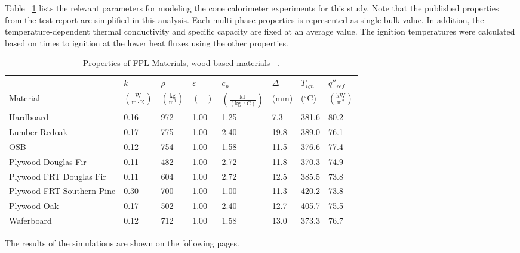 Table ~\ref{Properties_FPL_Wood_Materials_woods} lists the relevant parameters for modeling the cone calorimeter experiments for this study.
Note that the published properties from the test report are simplified in this analysis. Each multi-phase properties is represented as single bulk value.
In addition, the temperature-dependent thermal conductivity and specific capacity are fixed at an average value.
The ignition temperatures were calculated based on times to ignition at the lower heat fluxes using the other properties.

\begin{table}[!h]
\caption[Properties of FPL Materials, wood-based materials]{Properties of FPL Materials, wood-based materials ~\cite{FPL:Fire_Database}.}
\centering
\begin{tabular}{|p{5.5cm}|p{1.0cm}|p{1.0cm}|p{0.8cm}|p{1.4cm}|p{1.0cm}|p{1.0cm}|p{1.2cm}|}
\hline
                                               & $k$    & $\rho$      & $\varepsilon$   & $c_{p}$ & $\Delta$    & $T_{ign}$ & $q''_{ref}$ \\
Material                                       & $\mathrm{\left(\frac{W}{m\cdot K}\right)}$ & $\mathrm{\left(\frac{kg}{m^{3}}\right)}$ & $\mathrm{( - )}$ & $\mathrm{\left(\frac{kJ}{(kg\cdot ^{\circ}C)}\right)}$ &  ($\mathrm{mm}$)   & ($\mathrm{^{\circ}C}$) & $\mathrm{\left(\frac{kW}{m^{2}}\right)}$ \\ \hline
\hline
Hardboard  & 0.16 & 972 & 1.00 & 1.25 & 7.3 & 381.6 & 80.2 \\ \hline
Lumber Redoak  & 0.17 & 775 & 1.00 & 2.40 & 19.8 & 389.0 & 76.1 \\ \hline
OSB  & 0.12 & 754 & 1.00 & 1.58 & 11.5 & 376.6 & 77.4 \\ \hline
Plywood Douglas Fir  & 0.11 & 482 & 1.00 & 2.72 & 11.8 & 370.3 & 74.9 \\ \hline
Plywood FRT Douglas Fir  & 0.11 & 604 & 1.00 & 2.72 & 12.5 & 385.5 & 73.8 \\ \hline
Plywood FRT Southern Pine  & 0.30 & 700 & 1.00 & 1.00 & 11.3 & 420.2 & 73.8 \\ \hline
Plywood Oak  & 0.17 & 502 & 1.00 & 2.40 & 12.7 & 405.7 & 75.5 \\ \hline
Waferboard  & 0.12 & 712 & 1.00 & 1.58 & 13.0 & 373.3 & 76.7 \\ \hline
\end{tabular}
\label{Properties_FPL_Wood_Materials_woods}
\end{table}

The results of the simulations are shown on the following pages.


